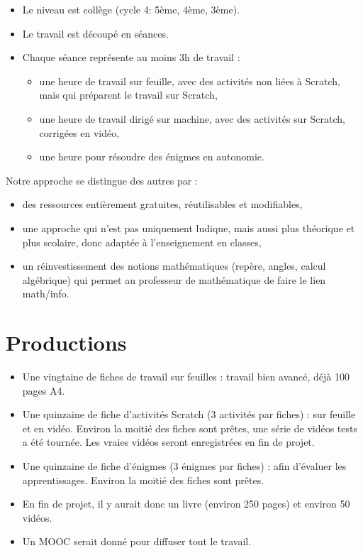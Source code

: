 \documentclass[class=report,crop=false, 12pt]{standalone}
\begin{document}
\begin{itemize}
\item Le niveau est collège (cycle 4: 5ème, 4ème, 3ème).
\item Le travail est découpé en séances.
\item Chaque séance représente au moins 3h de travail :
  \begin{itemize}
    \item une heure de travail sur feuille, avec des activités non liées à
  Scratch, mais qui préparent le travail sur Scratch,
    \item une heure de travail dirigé sur machine, avec des activités sur
  Scratch, corrigées en vidéo,
    \item une heure pour résoudre des énigmes en autonomie.
  \end{itemize}
\end{itemize}

\bigskip
\bigskip

Notre approche se distingue des autres par :
\begin{itemize}
  \item des ressources entièrement gratuites, réutilisables et modifiables,
  \item une approche qui n'est pas uniquement ludique, mais aussi plus théorique et plus scolaire, donc adaptée à l'enseignement en classes,
  \item un réinvestissement des notions mathématiques (repère, angles, calcul algébrique) qui permet au professeur de mathématique de faire le lien math/info.
\end{itemize}


\section{Productions}

\begin{itemize}
  \item Une vingtaine de fiches de travail sur feuilles : travail bien avancé, déjà 100 pages A4.

  \item Une quinzaine de fiche d'activités Scratch (3 activités par fiches) : sur feuille et en vidéo. 
  Environ la moitié des fiches sont prêtes, une série de vidéos tests a été tournée. Les vraies vidéos seront enregistrées en fin de projet.
  
  \item Une quinzaine de fiche d'énigmes (3 énigmes par fiches) : afin d'évaluer les apprentissages. Environ la moitié des fiches sont prêtes.
  
  \item En fin de projet, il y aurait donc un livre (environ 250 pages) et environ 50 vidéos.
  
  \item Un MOOC serait donné pour diffuser tout le travail.
\end{itemize}
\end{document}
